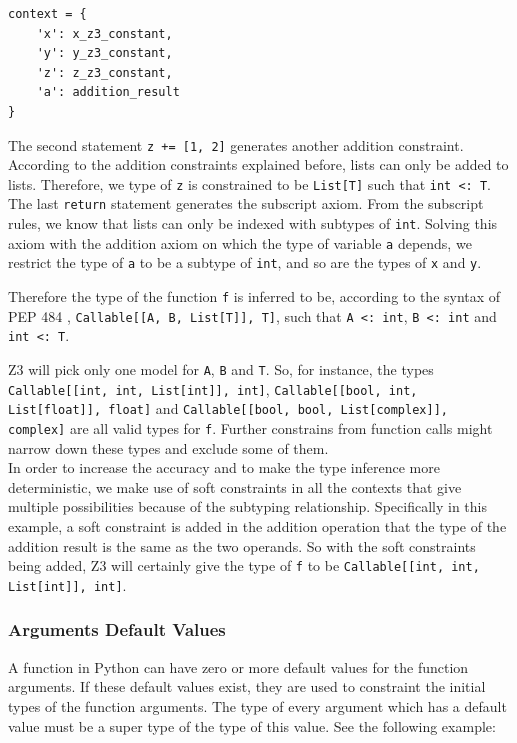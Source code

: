 \begin{lstlisting}
context = {
	'x': x_z3_constant,
	'y': y_z3_constant,
	'z': z_z3_constant,
	'a': addition_result
}
\end{lstlisting}

The second statement \lstinline|z += [1, 2]| generates another addition constraint. According to the addition constraints explained before, lists can only be added to lists. Therefore, we type of \lstinline|z| is constrained to be \lstinline|List[T]| such that \lstinline|int <: T|. The last \lstinline|return| statement generates the subscript axiom. From the subscript rules, we know that lists can only be indexed with subtypes of \lstinline|int|. Solving this axiom with the addition axiom on which the type of variable \lstinline|a| depends, we restrict the type of \lstinline|a| to be a subtype of \lstinline|int|, and so are the types of \lstinline|x| and \lstinline|y|.

Therefore the type of the function \lstinline|f| is inferred to be, according to the syntax of PEP 484 \cite{484}, \lstinline|Callable[[A, B, List[T]], T]|, such that \lstinline|A <: int|, \lstinline|B <: int| and \lstinline|int <: T|.

Z3 will pick only one model for \lstinline|A|, \lstinline|B| and \lstinline|T|. So, for instance, the types \lstinline|Callable[[int, int, List[int]], int]|, \lstinline|Callable[[bool, int, List[float]], float]| and \lstinline|Callable[[bool, bool, List[complex]], complex]| are all valid types for \lstinline|f|. Further constrains from function calls might narrow down these types and exclude some of them.\\

In order to increase the accuracy and to make the type inference more deterministic, we make use of soft constraints in all the contexts that give multiple possibilities because of the subtyping relationship. Specifically in this example, a soft constraint is added in the  addition operation that the type of the addition result is the same as the two operands. So with the soft constraints being added, Z3 will certainly give the type of \lstinline|f| to be \lstinline|Callable[[int, int, List[int]], int]|.

\subsubsection{Arguments Default Values}
A function in Python can have zero or more default values for the function arguments. If these default values exist, they are used to constraint the initial types of the function arguments. The type of every argument which has a default value must be a super type of the type of this value. See the following example:


